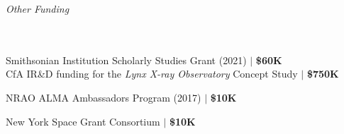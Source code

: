 \documentclass[11pt]{article}
\begin{document}
\vspace{6mm}

\hspace{2.5mm} \parbox{1.5in}{\textit{Other Funding \\\\\\}}
\parbox{5.15in}{
Smithsonian Institution Scholarly Studies Grant (2021) $|$ \textbf{\$60K} \\
CfA IR\&D funding for the \textit{Lynx X-ray Observatory} Concept Study $|$ \textbf{\$750K}

NRAO ALMA Ambassadors Program (2017) $|$ \textbf{\$10K}

New York Space Grant Consortium $|$ \textbf{\$10K}
}



\vspace{6mm}
\end{document}

